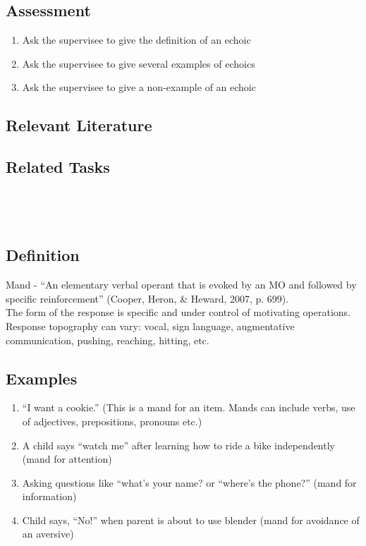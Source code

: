 \subsection{Assessment}
\begin{enumerate}
\item Ask the supervisee to give the definition of an echoic
\item Ask the supervisee to give several examples of echoics
\item Ask the supervisee to give a non-example of an echoic 
%
\end{enumerate}
%
\subsection{Relevant Literature}
\begin{refsection}
\nocite{cooper2014applied,
        sundberg2008verbal,
        skinner1957verbal}
\printbibliography[heading=none]
\end{refsection} 
%
\subsection{Related Tasks}
\fourdFour{}\\
\fourdTen{}\\
%
\clearpage \section{\fourFKFourtyFour{}}
\subsection{Definition}
Mand - ``An elementary verbal operant that is evoked by an MO and followed by specific reinforcement'' (Cooper, Heron, \& Heward, 2007, p. 699).\\

The form of the response is specific and under control of motivating operations. Response topography can vary: vocal, sign language, augmentative communication, pushing, reaching, hitting, etc.
%
\subsection{Examples}
\begin{enumerate}
\item ``I want a cookie.'' (This is a mand for an item. Mands can include verbs, use of adjectives, prepositions, pronouns etc.)
\item A child says ``watch me'' after learning how to ride a bike independently (mand for attention)
\item Asking questions like ``what's your name? or ``where's the phone?'' (mand for information)
\item Child says, ``No!'' when parent is about to use blender (mand for avoidance of an aversive)
%

%
\end{enumerate}
%
